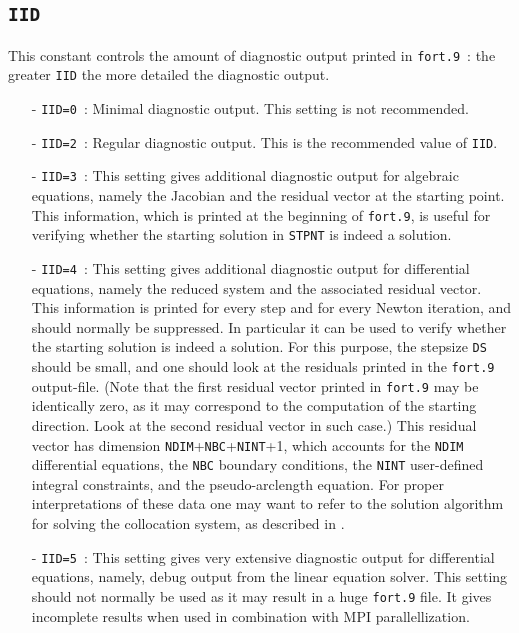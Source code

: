 \documentclass[12pt]{report}
\begin{document}
\subsection{\tt IID} \label{sec:IID} 
 This constant controls the amount of diagnostic output printed in {\tt fort.9}~:
 the greater {\tt IID} the more detailed the diagnostic output.
\begin{itemize}
\item[-] {\tt IID=0}~:  
  Minimal diagnostic output. This setting is not recommended.
\item[-] {\tt IID=2}~: 
  Regular diagnostic output. This is the recommended value of {\tt IID}.
\item[-] {\tt IID=3}~: 
  This setting gives additional diagnostic output for algebraic equations,
  namely the Jacobian and the residual vector at the starting point.
  This information, which is printed at the beginning of {\tt fort.9},
  is useful for verifying whether the starting solution in {\tt STPNT} is indeed 
  a solution.
\item[-] {\tt IID=4}~: 
  This setting gives additional diagnostic output for differential equations,
  namely the reduced system and the associated residual vector. 
  This information is printed for every step and for every Newton iteration,
  and should normally be suppressed.
  In particular it can be used to verify whether the starting solution
  is indeed a solution. For this purpose, the stepsize {\tt DS} should
  be small, and one should look at the residuals printed in the {\tt fort.9}
  output-file. (Note that the first residual vector printed in {\tt fort.9} may
  be identically zero, as it may correspond to the computation of the starting
  direction. Look at the second residual vector in such case.)
  This residual vector has dimension 
  {\tt NDIM}+{\tt NBC}+{\tt NINT}+1, which accounts for the {\tt NDIM}
  differential equations, the {\tt NBC} boundary conditions, the {\tt NINT} user-defined
  integral constraints, and the pseudo-arclength equation.
  For proper interpretations of these data one may want to refer to the solution
  algorithm for solving the collocation system, as described in
   \citeyear{DoKeKe:91b}.
\item[-] {\tt IID=5}~:
  This setting gives very extensive diagnostic output for differential equations,
  namely, debug output from the linear equation solver.
  This setting should not normally be used as it may result
  in a huge {\tt fort.9} file. It gives incomplete results when
  used in combination with MPI parallellization.
\end{itemize}
\end{document}
